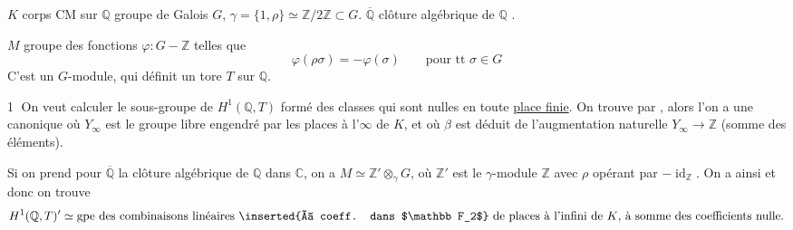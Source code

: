 $K$ corps CM  sur $\mathbb Q$ groupe de Galois $G$,
$\gamma=\{1,\rho\}\simeq\mathbb Z/2\mathbb Z\subset G$.
$\overline{\mathbb Q}$  clôture algébrique de $\mathbb Q$
.


$M$ groupe des fonctions \deleted{\unsure{\varphi}} $\varphi:G-\mathbb Z$ telles que
\[
\varphi(\rho\sigma)=-\varphi(\sigma)\qquad\text{pour tt }\sigma\in G
\]
C'est un $G$-module, qui définit  un tore $T$ sur $\mathbb Q$.

\textcircled{1} On veut calculer le sous-groupe  de
$H^1(\mathbb Q,T)$ formé des classes qui sont nulles en toute \uline{place finie}.
On trouve par , alors l'on a
une   canonique
où $Y_\infty$ est le groupe libre engendré par les places à l'$\infty$ de $K$,
et où $\beta$ est déduit de l'augmentation naturelle $Y_\infty\longrightarrow\mathbb Z$
(somme des éléments).

Si on prend pour $\overline{\mathbb Q}$ la clôture algébrique de $\mathbb Q$ dans $\mathbb C$,
on a $M\simeq\mathbb Z'\otimes_{\gamma}G$, où $\mathbb Z'$ est le $\gamma$-module
$\mathbb Z$ avec $\rho$ opérant par $-\operatorname{id}_{\mathbb Z}$. On a ainsi
et donc on trouve
\[
H^1(\mathbb Q,T)'\simeq\text{gpe des combinaisons linéaires
\inserted{à coeff. dans $\mathbb F_2$} de places à l'infini de $K$, à somme des coefficients nulle.}
\]
